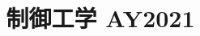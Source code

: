 \documentclass[11pt,a4paper]{article}
\title{制御工学 AY2021}
\author{}
\date{}
\begin{document}
\maketitle


\bigskip

\end{document}
